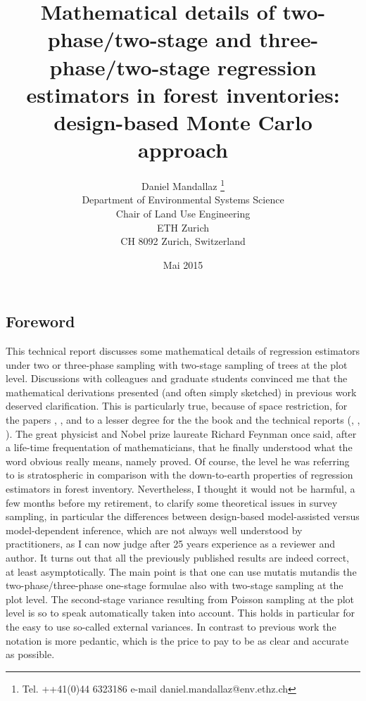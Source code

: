 \documentclass[a4paper,12pt,leqno, titlepage]{article}
\begin{document}
\doublespacing
\pagestyle{plain}

\title{Mathematical details of two-phase/two-stage and three-phase/two-stage regression estimators in forest inventories: design-based Monte Carlo approach}
\author{Daniel Mandallaz \thanks{Tel. ++41(0)44 6323186 e-mail
    daniel.mandallaz@env.ethz.ch} \\Department of Environmental Systems Science\\
    Chair of Land Use Engineering\\ETH Zurich\\CH 8092 Zurich, Switzerland \\}
\date{Mai 2015}

\maketitle
\newpage
\nolinenumbers
\begin{center}
\section*{Foreword}\label{foreword}
\end{center}
This technical report discusses some mathematical details of regression estimators under two or three-phase sampling with two-stage sampling of trees at the plot level. Discussions with colleagues and graduate students convinced me that the mathematical derivations presented (and often simply sketched) in previous work deserved clarification. This is particularly true, because of space restriction, for the papers \cite{mandallaz3}, \cite{mandallaz4}, \cite{mandallaz5} and to a lesser degree for the the book \cite{mandallaz} and the technical reports (\cite{mandallazreport1}, \cite{mandallazreport2}, \cite{mandallazreport3}). The great physicist and Nobel prize laureate Richard Feynman once said, after a life-time frequentation of mathematicians, that he finally understood what the word obvious really means, namely proved. Of course, the level he was referring to is stratospheric in comparison with the down-to-earth properties of regression estimators in forest inventory. Nevertheless, I thought it would not be harmful, a few months before my retirement, to clarify some theoretical issues in survey sampling, in particular the differences between design-based model-assisted versus model-dependent inference, which are not always well understood by practitioners, as I can now judge after 25 years experience as a reviewer and author. It turns out that all the previously published results are indeed correct, at least asymptotically. The main point is that one can use mutatis mutandis the two-phase/three-phase one-stage formulae also with two-stage sampling at the plot level. The second-stage variance resulting from Poisson sampling at the plot level is so to speak automatically taken into account. This holds in particular for the easy to use so-called external variances. In contrast to previous work the notation is more pedantic, which is the price to pay to be as clear and accurate as possible.
\newpage
\end{document}

